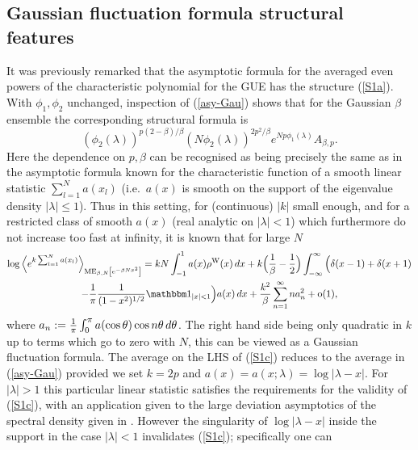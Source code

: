 \documentclass[11pt,a4paper]{article}
\numberwithin{equation}{section} %
\theoremstyle{plain}
\theoremstyle{definition}
\numberwithin{prop}{section}
\numberwithin{cor}{section}
\numberwithin{remark}{section}
\begin{document}
\subsection{Gaussian fluctuation formula structural features}
It was previously remarked that the asymptotic formula for the averaged even powers of the
characteristic polynomial for the GUE has the structure (\ref{S1a}). With $\phi_1, \phi_2$ unchanged,  inspection of (\ref{asy-Gau}) shows that for the Gaussian $\beta$ ensemble the corresponding structural formula is
\begin{equation}\label{S1b}
(\phi_2(\lambda))^{p (2 - \beta)/\beta}
(N \phi_2(\lambda))^{2p^2/\beta} e^{Np \phi_1(\lambda)} A_{\beta,p}.
\end{equation} 
Here the dependence on $p, \beta$ can be recognised as being precisely the same as
in the  asymptotic formula known for the characteristic function of 
a smooth linear statistic $\sum_{l=1}^N a(x_l)$ (i.e.~$a(x)$ is smooth on
the support of the eigenvalue density $|\lambda| \le 1$). Thus in this setting,
for (continuous) $|k|$ small enough, and for a restricted class of smooth $a(x)$ 
(real analytic on $|\lambda| < 1$) which
furthermore do not increase too fast at infinity, it is known that for large $N$ \cite{Jo98,BG11} 
\begin{multline}\label{S1c}
\log \Big \langle  e^{k \sum_{l=1}^N a(x_l)} \Big \rangle_{\mathrm{ME}_{\beta, N}\left[e^{-\beta N x^2}\right]} =
k N \int_{-1}^1 a(x) \rho^{\rm W}(x) \, dx + 
  k \Big ( {1 \over \beta} - {1 \over 2} \Big ) \int_{-\infty}^\infty \Big (  \delta(x - 1) + \delta(x+1) \\ - {1 \over \pi} {1 \over (1 - x^2)^{1/2}} \mathbbm 1_{|x|<1}\Big ) a(x) \, dx 
+ {k^2 \over \beta} \sum_{n=1}^\infty n a_n^2 + {\rm o}(1),
  \end{multline}
where $a_n :=  {1 \over \pi} \int_0^\pi a(\cos \theta) \cos n \theta \, d \theta$. The right hand side being only quadratic in $k$ up to terms which go to zero with $N$, this can be viewed as a Gaussian fluctuation formula. The
average on the LHS of (\ref{S1c}) reduces to the average in (\ref{asy-Gau}) provided
we set $k=2p$ and $a(x) = a(x;\lambda) = \log |\lambda - x|$. For $|\lambda| > 1$ this
particular linear statistic satisfies the requirements for the validity of 
(\ref{S1c}), with an application given to the large deviation asymptotics of the spectral
density given in \cite{Fo12}. However the singularity of $\log |\lambda - x|$ inside the support in the case $|\lambda| < 1$ invalidates (\ref{S1c}); specifically one can
\end{document}
